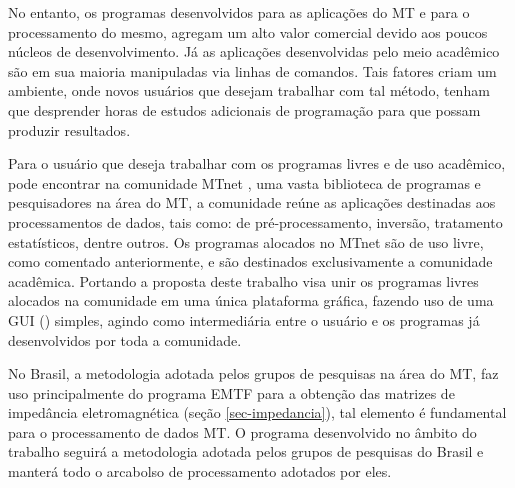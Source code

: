     No entanto, os programas desenvolvidos para as aplicações do MT e para o processamento do mesmo, agregam um alto valor comercial devido aos poucos núcleos de desenvolvimento. Já as aplicações desenvolvidas pelo meio acadêmico são em sua maioria manipuladas via linhas de comandos. Tais fatores criam um ambiente, onde novos usuários que desejam trabalhar com tal método, tenham que desprender horas de estudos adicionais de programação para que possam produzir resultados.       
    
    Para o usuário que deseja trabalhar com os programas livres e de uso acadêmico, pode encontrar na comunidade MTnet \cite{mtnet}, uma vasta biblioteca de programas e pesquisadores na área do MT, a comunidade reúne as aplicações destinadas aos processamentos de dados, tais como:  de pré-processamento, inversão, tratamento estatísticos, dentre outros. Os programas alocados no MTnet são de uso livre, como comentado anteriormente, e são destinados exclusivamente a comunidade acadêmica. Portando a proposta deste trabalho visa unir os programas livres alocados na comunidade em uma única plataforma gráfica, fazendo uso de uma GUI () simples, agindo como intermediária entre o usuário e os programas já desenvolvidos por toda a comunidade.
    
    No Brasil, a metodologia adotada pelos grupos de pesquisas na área do MT, faz uso principalmente do programa EMTF para a obtenção das matrizes de impedância eletromagnética (seção \ref{sec-impedancia}), tal elemento é fundamental para o processamento de dados MT. O programa desenvolvido no âmbito do trabalho seguirá a metodologia adotada pelos grupos de pesquisas do Brasil e manterá todo o arcabolso de processamento adotados por eles.
    

    
    
     
    
